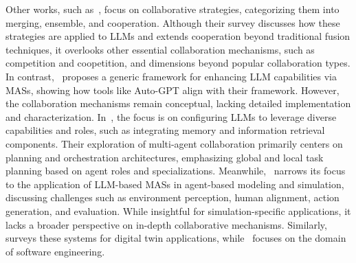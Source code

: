 \documentclass[acmsmall,nonacm]{acmart}
\begin{document}
        Other works, such as~\cite{lu2024mergeensemblecooperatesurvey}, focus on collaborative strategies, categorizing them into merging, ensemble, and cooperation. Although their survey discusses how these strategies are applied to LLMs and extends cooperation beyond traditional fusion techniques, it overlooks other essential collaboration mechanisms, such as competition and coopetition, and dimensions beyond popular collaboration types. In contrast,~\cite{talebirad2023multiagentcollaborationharnessingpower} proposes a generic framework for enhancing LLM capabilities via MASs, showing how tools like Auto-GPT align with their framework. However, the collaboration mechanisms remain conceptual, lacking detailed implementation and characterization. In~\cite{han2024llmmultiagentsystemschallenges}, the focus is on configuring LLMs to leverage diverse capabilities and roles, such as integrating memory and information retrieval components. Their exploration of multi-agent collaboration primarily centers on planning and orchestration architectures, emphasizing global and local task planning based on agent roles and specializations. Meanwhile,~\cite{Gao2024} narrows its focus to the application of LLM-based MASs in agent-based modeling and simulation, discussing challenges such as environment perception, human alignment, action generation, and evaluation. While insightful for simulation-specific applications, it lacks a broader perspective on in-depth collaborative mechanisms. Similarly,~\cite{10.1145/3697350} surveys these systems for digital twin applications, while~\cite{he2024llm,10.1145/3704806} focuses on the domain of software engineering.
\end{document}
